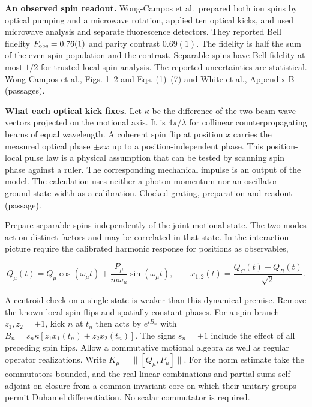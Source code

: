 \documentclass[11pt,a4paper]{article}
\begin{document}
\textbf{An observed spin readout.} Wong-Campos et al.~prepared both ion
spins by optical pumping and a microwave rotation, applied ten optical
kicks, and used microwave analysis and separate fluorescence detectors.
They reported Bell fidelity \(F_{\rm obs}=0.76(1)\) and parity contrast
\(0.69(1)\). The fidelity is half the sum of the even-spin population
and the contrast. Separable spins have Bell fidelity at most \(1/2\) for
trusted local spin analysis. The reported uncertainties are statistical.
\href{https://link.aps.org/accepted/10.1103/PhysRevLett.119.230501}{Wong-Campos
et al., Figs. 1--2 and Eqs. (1)--(7)} and
\href{https://quantum.prof/publications/2007/measuringGates.pdf}{White
et al., Appendix B} (passages).

\textbf{What each optical kick fixes.} Let \(\kappa\) be the difference
of the two beam wave vectors projected on the motional axis. It is
\(4\pi/\lambda\) for collinear counterpropagating beams of equal
wavelength. A coherent spin flip at position \(x\) carries the measured
optical phase \(\pm\kappa x\) up to a position-independent phase. This
position-local pulse law is a physical assumption that can be tested by
scanning spin phase against a ruler. The corresponding mechanical
impulse is an output of the model. The calculation uses neither a photon
momentum nor an oscillator ground-state width as a calibration.
\href{groupoid-quantum-newton-states.md\#preparation-and-readout}{Clocked
grating, preparation and readout} (passage).

Prepare separable spins independently of the joint motional state. The
two modes act on distinct factors and may be correlated in that state.
In the interaction picture require the calibrated harmonic response for
positions as observables,

\[
Q_\mu(t)=Q_\mu\cos(\omega_\mu t)
        +\frac{P_\mu}{m\omega_\mu}\sin(\omega_\mu t),
\qquad
x_{1,2}(t)=\frac{Q_C(t)\pm Q_R(t)}{\sqrt2}.
\]

A centroid check on a single state is weaker than this dynamical
premise. Remove the known local spin flips and spatially constant
phases. For a spin branch \(z_1,z_2=\pm1\), kick \(n\) at \(t_n\) then
acts by \(e^{iB_n}\) with \(B_n=s_n\kappa[z_1x_1(t_n)+z_2x_2(t_n)]\).
The signs \(s_n=\pm1\) include the effect of all preceding spin flips.
Allow a commutative motional algebra as well as regular operator
realizations. Write \(K_\mu=\|[Q_\mu,P_\mu]\|\). For the norm estimate
take the commutators bounded, and the real linear combinations and
partial sums self-adjoint on closure from a common invariant core on
which their unitary groups permit Duhamel differentiation. No scalar
commutator is required.
\end{document}
